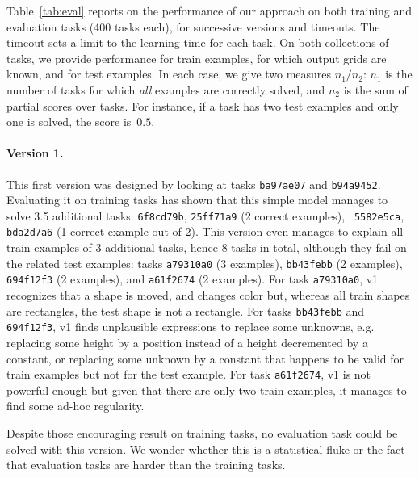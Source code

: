 \documentclass[a4paper]{llncs}
\begin{document}
Table~\ref{tab:eval} reports on the performance of our approach on
both training and evaluation tasks (400 tasks each), for successive
versions and timeouts. The timeout sets a limit to the learning time
for each task. On both collections of tasks, we provide performance
for train examples, for which output grids are known, and for test
examples. In each case, we give two measures $n_1/n_2$: $n_1$ is the
number of tasks for which {\em all} examples are correctly solved, and
$n_2$ is the sum of partial scores over tasks. For instance, if a task
has two test examples and only one is solved, the score is~$0.5$.

\paragraph{Version 1.} This first version was designed by looking at
tasks {\tt ba97ae07} and {\tt b94a9452}. Evaluating it on training
tasks has shown that this simple model manages to solve 3.5 additional
tasks: {\tt 6f8cd79b}, {\tt 25ff71a9} (2 correct examples), {\tt
  5582e5ca}, {\tt bda2d7a6} (1 correct example out of 2). This version
even manages to explain all train examples of 3 additional tasks,
hence 8 tasks in total, although they fail on the related test
examples: tasks {\tt a79310a0} (3 examples), {\tt bb43febb} (2
examples), {\tt 694f12f3} (2 examples), and {\tt a61f2674} (2
examples). For task {\tt a79310a0}, v1 recognizes that a shape is
moved, and changes color but, whereas all train shapes are rectangles,
the test shape is not a rectangle. For tasks {\tt bb43febb} and {\tt
  694f12f3}, v1 finds unplausible expressions to replace some
unknowns, e.g. replacing some height by a position instead of a height
decremented by a constant, or replacing some unknown by a constant
that happens to be valid for train examples but not for the test
example. For task {\tt a61f2674}, v1 is not powerful enough but given
that there are only two train examples, it manages to find some ad-hoc
regularity.

Despite those encouraging result on training tasks, no evaluation task
could be solved with this version. We wonder whether this is a
statistical fluke or the fact that evaluation tasks are harder than
the training tasks.
\end{document}
